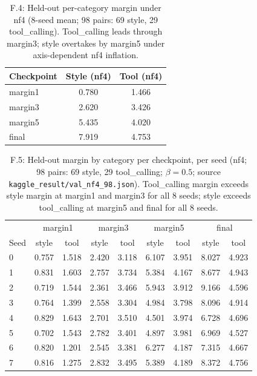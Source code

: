 \begin{table}[H]
\centering
\small
\caption{F.4: Held-out per-category margin under nf4 (8-seed mean; 98 pairs: 69 style, 29 tool\_calling). Tool\_calling leads through margin3; style overtakes by margin5 under axis-dependent nf4 inflation.}
\label{tab:heldout-nf4}
\begin{tabular}{@{}lcc@{}}
\toprule
Checkpoint & Style (nf4) & Tool (nf4)\\
\midrule
margin1 & 0.780 & 1.466\\
margin3 & 2.620 & 3.426\\
margin5 & 5.435 & 4.020\\
final & 7.919 & 4.753\\
\bottomrule
\end{tabular}
\end{table}

\begin{table}[H]
\centering
\small
\caption{F.5: Held-out margin by category per checkpoint, per seed (nf4; 98 pairs: 69 style, 29 tool\_calling; $\beta{=}0.5$; source \texttt{kaggle\_result/val\_nf4\_98.json}). Tool\_calling margin exceeds style margin at margin1 and margin3 for all 8 seeds; style exceeds tool\_calling at margin5 and final for all 8 seeds.}
\label{tab:heldout-nf4-perseed}
\begin{tabular}{@{}lcccccccc@{}}
\toprule
 & \multicolumn{2}{c}{margin1} & \multicolumn{2}{c}{margin3} & \multicolumn{2}{c}{margin5} & \multicolumn{2}{c}{final}\\
Seed & style & tool & style & tool & style & tool & style & tool\\
\midrule
0 & 0.757 & 1.518 & 2.420 & 3.118 & 6.107 & 3.951 & 8.027 & 4.923\\
1 & 0.831 & 1.603 & 2.757 & 3.734 & 5.384 & 4.167 & 8.677 & 4.943\\
2 & 0.719 & 1.544 & 2.361 & 3.466 & 5.943 & 3.912 & 9.166 & 4.596\\
3 & 0.764 & 1.399 & 2.558 & 3.304 & 4.984 & 3.798 & 8.096 & 4.914\\
4 & 0.829 & 1.643 & 2.701 & 3.510 & 4.501 & 3.974 & 6.728 & 4.696\\
5 & 0.702 & 1.543 & 2.782 & 3.401 & 4.897 & 3.981 & 6.969 & 4.527\\
6 & 0.820 & 1.201 & 2.545 & 3.381 & 6.277 & 4.187 & 7.315 & 4.667\\
7 & 0.816 & 1.275 & 2.832 & 3.495 & 5.389 & 4.189 & 8.372 & 4.756\\
\bottomrule
\end{tabular}
\end{table}


